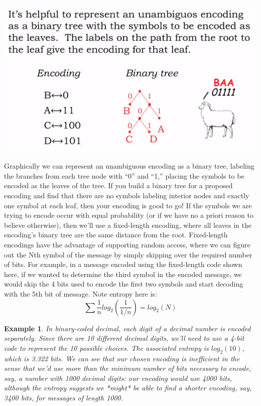 \documentclass[a4paper,twoside]{article}
\newtheorem{example}[theorem]{Example}
\numberwithin{equation}{section}
\begin{document}
\begin{center}
    \includegraphics[scale=0.3]{assets/encodings_tree.png}
\end{center}
Graphically we can represent an unambiguous encoding as a binary tree, labeling the branches from each
tree node with “0” and “1,” placing the symbols to be encoded as the leaves of the tree. If you build a
binary tree for a proposed encoding and find that there are no symbols labeling interior nodes and exactly
one symbol at each leaf, then your encoding is good to go!\newline
If the symbols we are trying to encode occur with equal probability (or if we have no a priori reason
to believe otherwise), then we'll use a fixed-length encoding, where all leaves in the encoding's binary
 tree are the same distance from the root. Fixed-length encodings have the advantage of supporting random
 access, where we can figure out the Nth symbol of the message by simply skipping over the required number
 of bits. For example, in a message encoded using the fixed-length code shown here, if we wanted to determine
 the third symbol in the encoded message, we would skip the 4 bits used to encode the first two symbols and
 start decoding with the 5th bit of message. Note entropy here is:
\begin{equation}
    \sum \dfrac{1}{n} log_2(\dfrac{1}{1/n}) = log_2(N)
\end{equation}
\begin{example}
    In binary-coded decimal, each digit of a decimal number is encoded separately. Since there are 10
    different decimal digits, we'll need to use a 4-bit code to represent the 10 possible choices.
     The associated entropy is $log_2(10)$, which is 3.322 bits. We can see that our chosen encoding
     is inefficient in the sense that we'd use more than the minimum number of bits necessary to encode,
     say, a number with 1000 decimal digits: our encoding would use 4000 bits, although the entropy
     suggests we *might* be able to find a shorter encoding, say, 3400 bits, for messages of length 1000.
\end{example}
\end{document}
